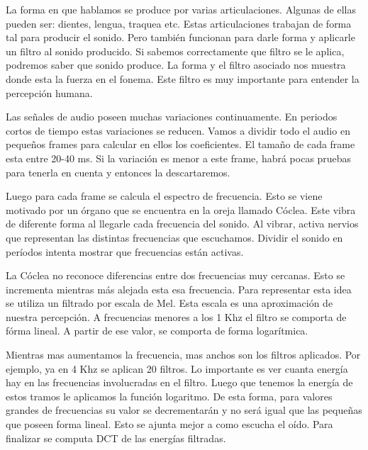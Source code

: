 
La forma en que hablamos se produce por varias articulaciones. Algunas de ellas pueden ser: dientes, lengua, traquea etc. Estas articulaciones trabajan de forma tal para producir el sonido. Pero también funcionan para darle forma y aplicarle un filtro al sonido producido. Si sabemos correctamente que filtro se le aplica, podremos saber que sonido produce. La forma y el filtro asociado nos muestra donde esta la fuerza en el fonema. Este filtro es muy importante para entender la percepción humana.

Las señales de audio poseen muchas variaciones continuamente. En periodos cortos de tiempo estas variaciones se reducen. Vamos a dividir todo el audio en pequeños frames para calcular en ellos los coeficientes. El tamaño de cada frame esta entre 20-40 ms. Si la variación es menor a este frame, habrá pocas pruebas para tenerla en cuenta y entonces la descartaremos.

Luego para cada frame se calcula el espectro de frecuencia. Esto se viene motivado por un órgano que se encuentra en la oreja llamado Cóclea. Este vibra de diferente forma al llegarle cada frecuencia del sonido. Al vibrar, activa nervios que representan las distintas frecuencias que escuchamos. Dividir el sonido en períodos intenta mostrar que frecuencias están activas.

La Cóclea no reconoce diferencias entre dos frecuencias muy cercanas. Esto se incrementa mientras más alejada esta esa frecuencia. Para representar esta idea se utiliza un filtrado por escala de Mel. Esta escala es una aproximación de nuestra percepción. A frecuencias menores a los 1 Khz el filtro se comporta de fórma lineal. A partir de ese valor, se comporta de forma logarítmica. 


Mientras mas aumentamos la frecuencia, mas anchos son los filtros aplicados. Por ejemplo, ya en 4 Khz se aplican 20 filtros. Lo importante es ver cuanta energía hay en las frecuencias involucradas en el filtro. Luego que tenemos la energía de estos tramos le aplicamos la función logaritmo. De esta forma, para valores grandes de frecuencias su valor se decrementarán y no será igual que las pequeñas que poseen forma lineal. Esto se ajunta mejor a como escucha el oído. Para finalizar se computa DCT de las energías filtradas. 

